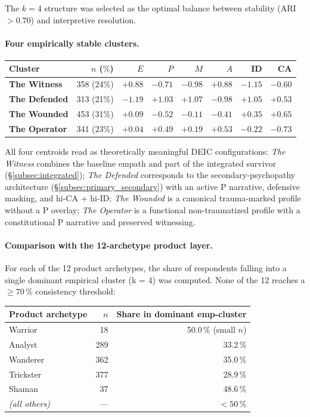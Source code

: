 The $k = 4$ structure was selected as the optimal balance between stability (ARI~$> 0.70$) and interpretive resolution.

\paragraph{Four empirically stable clusters.}

\begin{center}
\small
\begin{tabular}{lrrrrrrr}
\toprule
Cluster & $n$ ($\%$) & $E$ & $P$ & $M$ & $A$ & ID & CA \\
\midrule
\textbf{The Witness} & 358 (24\%) & $+0.88$ & $-0.71$ & $-0.98$ & $+0.88$ & $-1.15$ & $-0.60$ \\
\textbf{The Defended} & 313 (21\%) & $-1.19$ & $+1.03$ & $+1.07$ & $-0.98$ & $+1.05$ & $+0.53$ \\
\textbf{The Wounded} & 453 (31\%) & $+0.09$ & $-0.52$ & $-0.11$ & $-0.41$ & $+0.35$ & $+0.65$ \\
\textbf{The Operator} & 341 (23\%) & $+0.04$ & $+0.49$ & $+0.19$ & $+0.53$ & $-0.22$ & $-0.73$ \\
\bottomrule
\end{tabular}
\end{center}

All four centroids read as theoretically meaningful DEIC configurations: \emph{The Witness} combines the baseline empath and part of the integrated survivor (§\ref{subsec:integrated}); \emph{The Defended} corresponds to the secondary-psychopathy architecture (§\ref{subsec:primary_secondary}) with an active P narrative, defensive masking, and hi-CA + hi-ID; \emph{The Wounded} is a canonical trauma-marked profile without a P overlay; \emph{The Operator} is a functional non-traumatized profile with a constitutional P narrative and preserved witnessing.

\paragraph{Comparison with the 12-archetype product layer.} For each of the 12 product archetypes, the share of respondents falling into a single dominant empirical cluster (k = 4) was computed. None of the 12 reaches a $\geq 70$\,\% consistency threshold:

\begin{center}
\small
\begin{tabular}{lrr}
\toprule
Product archetype & $n$ & Share in dominant emp-cluster \\
\midrule
Warrior & 18 & 50.0\,\% (small $n$) \\
Analyst & 289 & 33.2\,\% \\
Wanderer & 362 & 35.0\,\% \\
Trickster & 377 & 28.9\,\% \\
Shaman & 37 & 48.6\,\% \\
\textit{(all others)} & --- & $< 50$\,\% \\
\bottomrule
\end{tabular}
\end{center}

